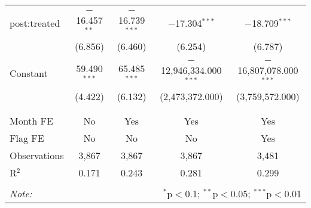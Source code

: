 \documentclass[12pt,]{article}
\begin{document}
\begin{table}[!htbp]
\begin{tabular}{@{\extracolsep{5pt}}lcccc}
  & & & & \\ 
 post:treated & $-$16.457$^{**}$ & $-$16.739$^{***}$ & $-$17.304$^{***}$ & $-$18.709$^{***}$ \\ 
  & (6.856) & (6.460) & (6.254) & (6.787) \\ 
  & & & & \\ 
 Constant & 59.490$^{***}$ & 65.485$^{***}$ & $-$12,946,334.000$^{***}$ & $-$16,807,078.000$^{***}$ \\ 
  & (4.422) & (6.132) & (2,473,372.000) & (3,759,572.000) \\ 
  & & & & \\ 
\hline \\[-1.8ex] 
Month FE & No & Yes & Yes & Yes \\ 
Flag FE & No & No & No & Yes \\ 
Observations & 3,867 & 3,867 & 3,867 & 3,481 \\ 
R$^{2}$ & 0.171 & 0.243 & 0.281 & 0.299 \\ 
\hline 
\hline \\[-1.8ex] 
\textit{Note:}  & \multicolumn{4}{r}{$^{*}$p$<$0.1; $^{**}$p$<$0.05; $^{***}$p$<$0.01} \\ 
\end{tabular} 
\end{table}
\end{document}
